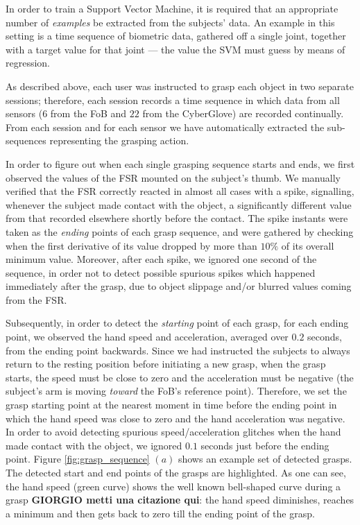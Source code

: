 In order to train a Support Vector Machine, it is required that an
appropriate number of \emph{examples} be extracted from the subjects'
data. An example in this setting is a time sequence of biometric data,
gathered off a single joint, together with a target value for that
joint --- the value the SVM must guess by means of regression.

As described above, each user was instructed to grasp each object in
two separate sessions; therefore, each session records a time sequence
in which data from all sensors ($6$ from the FoB and $22$ from the
CyberGlove) are recorded continually. From each session and for each
sensor we have automatically extracted the sub-sequences representing
the grasping action.

In order to figure out when each single grasping sequence starts and
ends, we first observed the values of the FSR mounted on the subject's
thumb. We manually verified that the FSR correctly reacted in almost
all cases with a spike, signalling, whenever the subject made contact
with the object, a significantly different value from that recorded
elsewhere shortly before the contact. The spike instants were taken as
the \emph{ending} points of each grasp sequence, and were gathered by
checking when the first derivative of its value dropped by more than
$10\%$ of its overall minimum value. Moreover, after each spike, we
ignored one second of the sequence, in order not to detect possible
spurious spikes which happened immediately after the grasp, due to
object slippage and/or blurred values coming from the FSR.

Subsequently, in order to detect the \emph{starting} point of each
grasp, for each ending point, we observed the hand speed and
acceleration, averaged over $0.2$ seconds, from the ending point
backwards. Since we had instructed the subjects to always return to
the resting position before initiating a new grasp, when the grasp
starts, the speed must be close to zero and the acceleration must be
negative (the subject's arm is moving \emph{toward} the FoB's
reference point). Therefore, we set the grasp starting point at the
nearest moment in time before the ending point in which the hand speed
was close to zero and the hand acceleration was negative. In order to
avoid detecting spurious speed/acceleration glitches when the hand
made contact with the object, we ignored $0.1$ seconds just before the
ending point. Figure \ref{fig:grasp_sequence} $(a)$ shows an example
set of detected grasps. The detected start and end points of the
grasps are highlighted. As one can see, the hand speed (green curve)
shows the well known bell-shaped curve during a grasp \cite{...} {\bf
GIORGIO metti una citazione qui}: the hand speed diminishes, reaches a
minimum and then gets back to zero till the ending point of the grasp.

